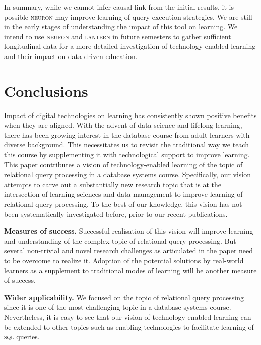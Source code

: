 \documentclass[11pt]{article}
\begin{document}
 In summary, while we cannot infer causal link from the initial results, it is possible \textsc{neuron} may improve learning of query execution strategies. We are still in the early stages of understanding the impact of this tool on learning. We intend to use \textsc{neuron} and \textsc{lantern} in future semesters to gather sufficient longitudinal data for a more detailed investigation of technology-enabled learning and their impact on data-driven education.

\section{Conclusions}
\label{concl}
Impact of digital technologies on learning has consistently shown positive benefits when they are aligned.  With the advent of data science and lifelong learning, there has been growing interest in the database course from adult learners with diverse background. This necessitates us to revisit the traditional way we teach this course by supplementing it with technological support to improve learning. This paper contributes a vision of technology-enabled learning of the topic of relational query processing in a database systems course. Specifically, our vision attempts to carve out a substantially new research topic that is at the intersection of learning sciences and data management to improve learning of relational query processing.  To the best of our knowledge, this vision has not been systematically investigated before, prior to our recent publications.

\vspace{1ex}\noindent\textbf{Measures of success.} Successful realisation of this vision will improve learning and understanding of the complex topic of relational query processing. But several non-trivial and novel research challenges as articulated in the paper need to be overcome to realize  it. Adoption of the potential solutions by real-world learners as a supplement to traditional modes of learning will be another measure of success.

\vspace{1ex}\noindent\textbf{Wider applicability.} We focused on the topic of relational query processing since it is one of the most challenging topic in a database systems course. Nevertheless, it is easy to see that our vision of technology-enabled learning can be extended to other topics such as enabling technologies to facilitate learning of \textsc{sql} queries.
\end{document}
